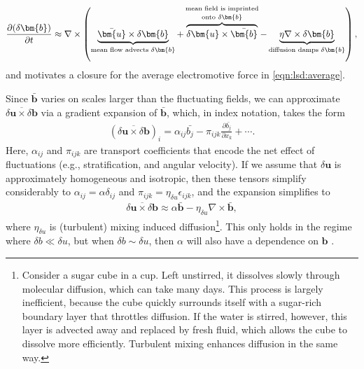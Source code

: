 \documentclass[12pt,twoside]{extreport}
\newcommand{\rbrac}[1]{\left( #1 \right)} %
\newcommand{\mCurl}[1]{\nabla \times #1} %
\newcommand{\mVector}[1]{\bm{#1}} %
\newcommand{\mpp}[1]{\partial #1}
\newcommand{\mppFrac}[2]{\frac{\mpp{#1}}{\mpp{#2}}}
\newcommand{\eg}{e.g.,\xspace} %
\begin{document}
\begin{align}
    \mppFrac{(\delta\mVector{b})}{t}
        \approx \mCurl{\rbrac{
            \underbrace{
                \bar{\mVector{u}}\times\delta\mVector{b}
            }_\text{mean flow advects $\delta\mVector{b}$}
            + \overbrace{
                \delta\mVector{u}\times\bar{\mVector{b}}
            }^\text{\shortstack{mean field is imprinted\\ onto $\delta\mVector{b}$}}
            - \underbrace{
                \eta \mCurl{\delta\mVector{b}}
            }_\text{diffusion damps $\delta\mVector{b}$}
        }}
    , \label{eqn:lsd:delta:reduced}
\end{align}
and motivates a closure for the average electromotive force in \autoref{eqn:lsd:average}.

Since $\bar{\mVector{b}}$ varies on scales larger than the fluctuating fields, we can approximate $\overline{\delta\mVector{u} \times \delta\mVector{b}}$ via a gradient expansion of $\bar{\mVector{b}}$, which, in index notation, takes the form
\begin{align}
    (\overline{\delta\mVector{u} \times \delta\mVector{b}})_{i}
        = \alpha_{ij} \bar{b_j} - \pi_{ijk} \mppFrac{\bar{b_j}}{x_k} + \cdots
    .
\end{align}
Here, $\alpha_{ij}$ and $\pi_{ijk}$ are transport coefficients that encode the net effect of fluctuations (\eg stratification, and angular velocity). If we assume that $\delta\mVector{u}$ is approximately homogeneous and isotropic, then these tensors simplify considerably to $\alpha_{ij} = \alpha \delta_{ij}$ and $\pi_{ijk} = \eta_{\delta u} \epsilon_{ijk}$, and the expansion simplifies to
\begin{align}
    \overline{\delta\mVector{u} \times \delta\mVector{b}}
        \approx \alpha \bar{\mVector{b}} - \eta_{\delta u} \mCurl{\bar{\mVector{b}}}
    ,
\end{align}
where $\eta_{\delta u}$ is (turbulent) mixing induced diffusion\footnote{
    Consider a sugar cube in a cup. Left unstirred, it dissolves slowly through molecular diffusion, which can take many days. This process is largely inefficient, because the cube quickly surrounds itself with a sugar-rich boundary layer that throttles diffusion. If the water is stirred, however, this layer is advected away and replaced by fresh fluid, which allows the cube to dissolve more efficiently. Turbulent mixing enhances diffusion in the same way.
}. This only holds in the regime where $\delta b \ll \delta u$, but when $\delta b \sim \delta u$, then $\alpha$ will also have a dependence on $\mVector{b}$ \citep[see \eg][]{cattaneo1996nonlinear}.
\end{document}

